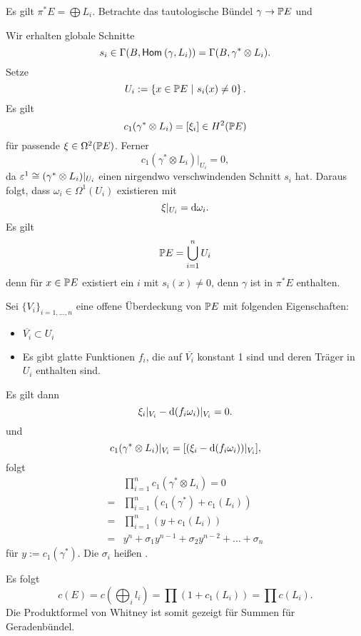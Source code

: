 Es gilt
$\pi^*E = \bigoplus L_i$. Betrachte das tautologische Bündel $\gamma \pfeil{} \P E$ und
\begin{center}
\end{center}
Wir erhalten globale Schnitte
\[ s_i \in \Gamma(B, \Hom{}{\gamma}{L_i}) = \Gamma(B, \gamma^* \otimes L_i). \]
Setze
\[ U_i := \set{x \in \P E}{s_i(x) \neq 0}. \]
Es gilt
\[ c_1(\gamma^* \otimes L_i) = [\xi_i] \in H^2(\P E) \]
für passende $\xi \in \Omega^2(\P E)$. Ferner
\[ c_1(\gamma^* \otimes L_i)|_{U_i} = 0, \]
da $\e^1 \isom{} (\gamma^* \otimes L_i)|_{U_i}$ einen nirgendwo verschwindenden Schnitt $s_i$ hat.
Daraus folgt, dass $\omega_i \in \Omega^1(U_i)$ existieren mit
\[ \xi|_{U_i} = \d \omega_i. \]
Es gilt
\[ \P E = \bigcup_{i=1}^n U_i \]
denn für $x \in \P E$ existiert ein $i$ mit $s_i(x) \neq 0$, denn $\gamma$ ist in $\pi^* E$ enthalten.

Sei $\{ V_i\}_{i = 1,\ldots, n}$ eine offene Überdeckung von $\P E$ mit folgenden Eigenschaften:
\begin{itemize}
	\item $\overline{V_i} \subset U_i$
	\item Es gibt glatte Funktionen $f_i$, die auf $\overline{V_i}$ konstant 1 sind und deren Träger in $U_i$ enthalten sind.
\end{itemize}
Es gilt dann
\[{\xi_i}|_{V_i} - \d (f_i \omega_i)|_{V_i} = 0. \]
und
\[ c_1(\gamma^* \otimes L_i)|_{V_i} = [ (\xi_i - \d (f_i \omega_i))|_{V_i}], \]
folgt
\begin{align*}
&\prod_{i= 1}^nc_1(\gamma^* \otimes L_i) = 0\\
=&\prod_{i= 1}^n(c_1(\gamma^*) + c_1(L_i))\\
=&\prod_{i= 1}^n(y + c_1(L_i))\\
=& y^n + \sigma_1 y^{n-1} + \sigma_2 y^{n-2} + \ldots + \sigma_n
\end{align*}
für $y := c_1(\gamma^*)$. Die $\sigma_i$ heißen .

Es folgt
\[ c(E) = c(\bigoplus_i l_i)
= \prod(1 + c_1(L_i)) = \prod c(L_i).
 \]
Die Produktformel von Whitney ist somit gezeigt für Summen für Geradenbündel.

